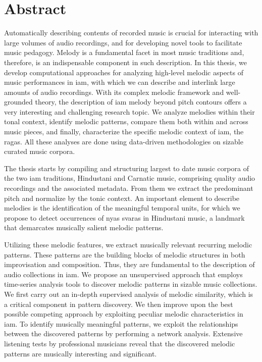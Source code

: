 
\chapter{Abstract}

Automatically describing contents of recorded music is crucial for interacting with large volumes of audio recordings, and for developing novel tools to facilitate music pedagogy. Melody is a fundamental facet in most music traditions and, therefore, is an indispensable component in such description. In this thesis, we develop computational approaches for analyzing high-level melodic aspects of music performances in \gls{iam}, with which we can describe and interlink large amounts of audio recordings. With its complex melodic framework and well-grounded theory, the description of \gls{iam} melody beyond pitch contours offers a very interesting and challenging research topic. We analyze melodies within their tonal context, identify melodic patterns, compare them both within and across music pieces, and finally, characterize the specific melodic context of \gls{iam}, the \glspl{raga}. All these analyses are done using data-driven methodologies on sizable curated music corpora.

The thesis starts by compiling and structuring largest to date music corpora of the two \gls{iam} traditions, Hindustani and Carnatic music, comprising quality audio recordings and the associated metadata. From them we extract the predominant pitch and normalize by the tonic context. An important element to describe melodies is the identification of the meaningful temporal units, for which we propose to detect occurrences of \gls{nyas} \glspl{svara} in Hindustani music, a landmark that demarcates musically salient melodic patterns.

Utilizing these melodic features, we extract musically relevant recurring melodic patterns. These patterns are the building blocks of melodic structures in both improvisation and composition. Thus, they are fundamental to the description of audio collections in \gls{iam}. We propose an unsupervised approach that employs time-series analysis tools to discover melodic patterns in sizable music collections. We first carry out an in-depth supervised analysis of melodic similarity, which is a critical component in pattern discovery. We then improve upon the best possible competing approach by exploiting peculiar melodic characteristics in \gls{iam}. To identify musically meaningful patterns, we exploit the relationships between the discovered patterns by performing a network analysis. Extensive listening tests by professional musicians reveal that the discovered melodic patterns are musically interesting and significant.

